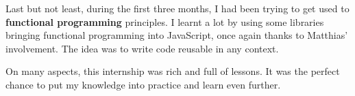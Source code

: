 \medskip

Last but not least, during the first three months, I had been trying to get used to \textbf{functional programming} principles. I learnt a lot by using some libraries bringing functional programming into JavaScript, once again thanks to Matthias' involvement. The idea was to write code reusable in any context.

\bigskip

On many aspects, this internship was rich and full of lessons. It was the perfect chance to put my knowledge into practice and learn even further.
